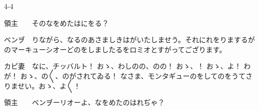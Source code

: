 \documentclass[tate,paper=b6j,jafontsize=9pt]{jlreq}
\begin{document}
\begin{azconvIndented}{4\zw}{-4\zw}

領主　　そのなをめたはにをる？

ベンヺ　りながら、なるのあさましきはがいたしませう。それにれをりまするがのマーキューシオーどのをしましたるをロミオとすがってござります。

カピ妻　なに、チッバルト！ おゝ、わしのの、のの！ おゝ、！ おゝ、よ！ わが！ おゝ、の{〳〵}、のがされてゐる！ なさま、モンタギューのをしてのをうてさりませい。おゝ、よ{〳〵}！

領主　　ベンヺーリオーよ、なをめたのはれぢゃ？


\end{azconvIndented}
\end{document}
